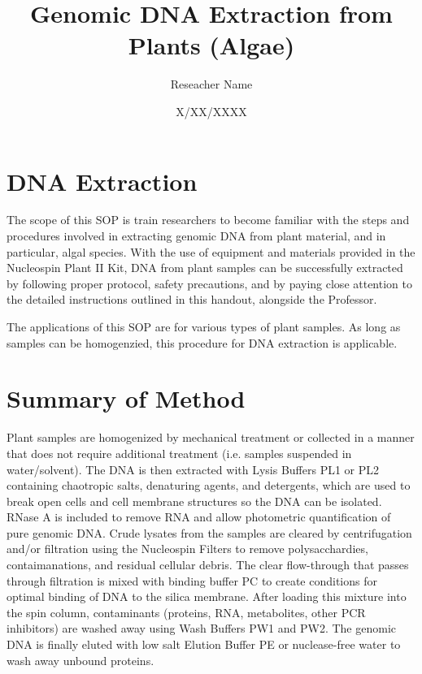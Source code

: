 \documentclass[12pt]{../SOP3_alpha}
\title{Genomic DNA Extraction from Plants (Algae)}
\date{X/XX/XXXX}
\author{Reseacher Name}
\begin{document}


\maketitle

\section{DNA Extraction }

\NP The scope of this SOP is train researchers to become familiar with the steps and procedures involved in extracting genomic DNA from plant material, and in particular, algal species. With the use of equipment and materials provided in the Nucleospin Plant II Kit, DNA from plant samples can be successfully extracted by following proper protocol, safety precautions, and by paying close attention to the detailed instructions outlined in this handout, alongside the Professor. 

\NP The applications of this SOP are for various types of plant samples. As long as samples can be homogenzied, this procedure for DNA extraction is applicable. 

\section{Summary of Method}

Plant samples are homogenized by mechanical treatment or collected in a manner that does not require additional treatment (i.e. samples suspended in water/solvent). The DNA is then extracted with Lysis Buffers PL1 or PL2 containing chaotropic salts, denaturing agents, and detergents, which are used to break open cells and cell membrane structures so the DNA can be isolated. RNase A is included to remove RNA and allow photometric quantification of pure genomic DNA. Crude lysates from the samples are cleared by centrifugation and/or filtration using the Nucleospin Filters to remove polysacchardies, contaimanations, and residual cellular debris. The clear flow-through that passes through filtration is mixed with binding buffer PC to create conditions for optimal binding of DNA to the silica membrane. After loading this mixture into the spin column, contaminants (proteins, RNA, metabolites, other PCR inhibitors) are washed away using Wash Buffers PW1 and PW2. The genomic DNA is finally eluted with low salt Elution Buffer PE or nuclease-free water to wash away unbound proteins.
\end{document}
